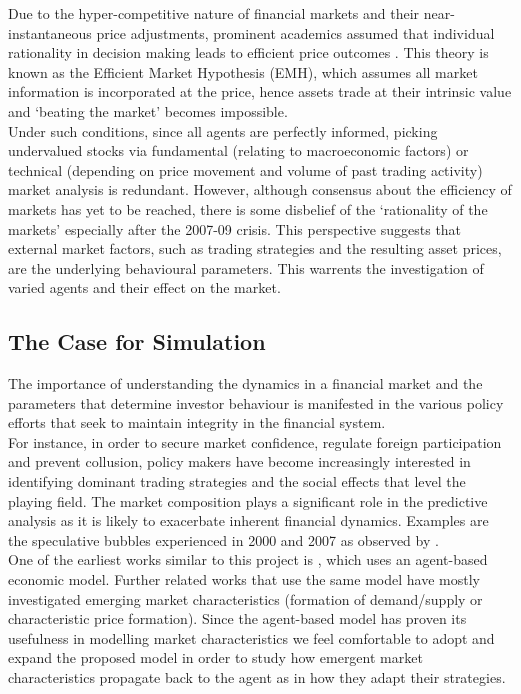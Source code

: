 \documentclass[11pt]{article}
\begin{document}
Due to the hyper-competitive nature of financial markets and their near-instantaneous price adjustments, prominent academics assumed that individual rationality in decision making leads to efficient price outcomes \citep{zeckhauser1991nonrational}. This theory is known as the Efficient Market Hypothesis (EMH), which assumes all market information is incorporated at the price, hence assets trade at their intrinsic value and `beating the market' becomes impossible. \\
Under such conditions, since all agents are perfectly informed, picking undervalued stocks via fundamental (relating to macroeconomic factors) or technical (depending on price movement and volume of past trading activity) market analysis is redundant. However, although consensus about the efficiency of markets has yet to be reached, there is some disbelief of the ‘rationality of the markets’ especially after the 2007-09 crisis. This perspective suggests that external market factors, such as trading strategies and the resulting asset prices, are the underlying behavioural parameters. This warrents the investigation of varied agents and their effect on the market. \\

\subsection{The Case for Simulation}
The importance of understanding the dynamics in a financial market and the parameters that determine investor behaviour is manifested in the various policy efforts that seek to maintain integrity in the financial system.\\
For instance, in order to secure market confidence, regulate foreign participation and prevent collusion, policy makers have become increasingly interested in identifying dominant trading strategies and the social effects that level the playing field. The market composition plays a significant role in the predictive analysis as it is likely to exacerbate inherent financial dynamics. Examples are the speculative bubbles experienced in 2000 and 2007 as observed by \citet{kaizoji2015super}. \\
One of the earliest works similar to this project is \citet{de1990noise}, which uses an agent-based economic model. Further related works that use the same model have mostly investigated emerging market characteristics (formation of demand/supply or characteristic price formation). Since the agent-based model has proven its usefulness in modelling market characteristics we feel comfortable to adopt and expand the proposed model in order to study how emergent market characteristics propagate back to the agent as in how they adapt their strategies.
\end{document}
